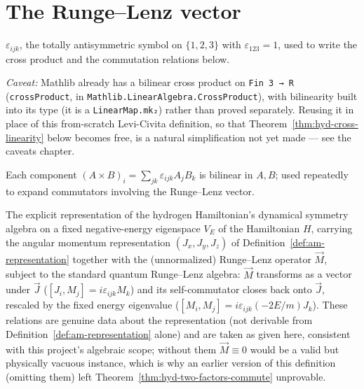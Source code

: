 \section{The Runge--Lenz vector}
\label{sec:hyd-basic}

\begin{definition}
  \label{def:hyd-levi-civita}
  \leanok
  $\varepsilon_{ijk}$, the totally antisymmetric symbol on $\{1,2,3\}$ with
  $\varepsilon_{123}=1$, used to write the cross product and the commutation
  relations below.

  \emph{Caveat:} Mathlib already has a bilinear cross product on
  \texttt{Fin 3 → R} (\texttt{crossProduct}, in
  \texttt{Mathlib.LinearAlgebra.CrossProduct}), with bilinearity built into
  its type (it is a \texttt{LinearMap.mk₂}) rather than proved separately.
  Reusing it in place of this from-scratch Levi-Civita definition, so that
  Theorem~\ref{thm:hyd-cross-linearity} below becomes free, is a natural
  simplification not yet made --- see the caveats chapter.
\end{definition}

\begin{theorem}
  \label{thm:hyd-cross-linearity}
  \leanok
  Each component $(A \times B)_i = \sum_{jk} \varepsilon_{ijk} A_j B_k$ is
  bilinear in $A, B$; used repeatedly to expand commutators involving the
  Runge--Lenz vector.
\end{theorem}

\begin{definition}
  \label{def:hyd-bound-state}
  \leanok
  The explicit representation of the hydrogen Hamiltonian's dynamical
  symmetry algebra on a fixed negative-energy eigenspace $V_E$ of the
  Hamiltonian $H$, carrying the angular momentum representation
  $(J_x,J_y,J_z)$ of Definition~\ref{def:am-representation} together with
  the (unnormalized) Runge--Lenz operator $\vec M$, subject to the standard
  quantum Runge--Lenz algebra: $\vec M$ transforms as a vector under $\vec
  J$ ($[J_i,M_j]=i\varepsilon_{ijk}M_k$) and its self-commutator closes back
  onto $\vec J$, rescaled by the fixed energy eigenvalue
  ($[M_i,M_j]=i\varepsilon_{ijk}(-2E/m)J_k$). These relations are genuine
  data about the representation (not derivable from
  Definition~\ref{def:am-representation} alone) and are taken as given here,
  consistent with this project's algebraic scope; without them
  $\vec M \equiv 0$ would be a valid but physically vacuous instance, which
  is why an earlier version of this definition (omitting them) left
  Theorem~\ref{thm:hyd-two-factors-commute} unprovable.
\end{definition}

